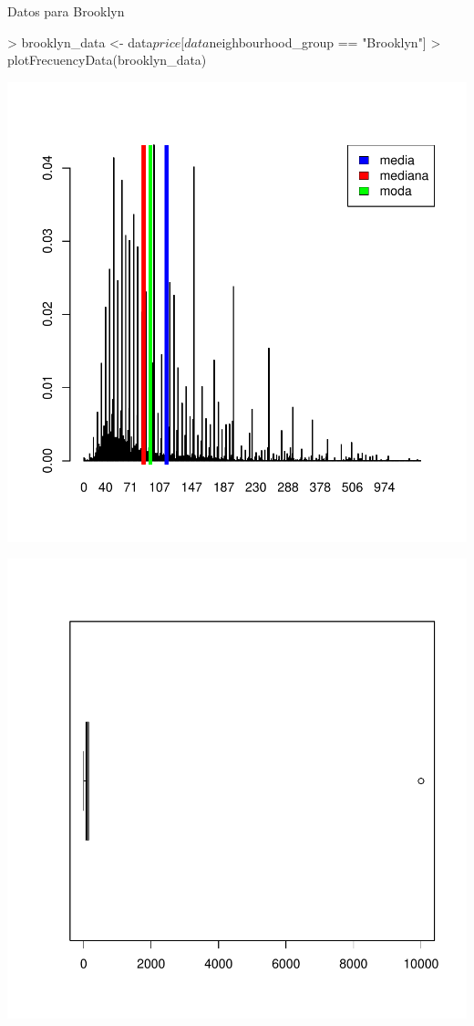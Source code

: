 \documentclass [a4paper] {article}
\begin{document}
\begin{center}
Datos para Brooklyn
\begin{center}
\begin{Schunk}
\begin{Sinput}
> brooklyn_data <- data$price[data$neighbourhood_group == "Brooklyn"]
> plotFrecuencyData(brooklyn_data)
\end{Sinput}
\end{Schunk}
\includegraphics{entrega-033}
\end{center}
\begin{center}
\includegraphics{entrega-034}
\end{center}


\end{center}
\end{document}
